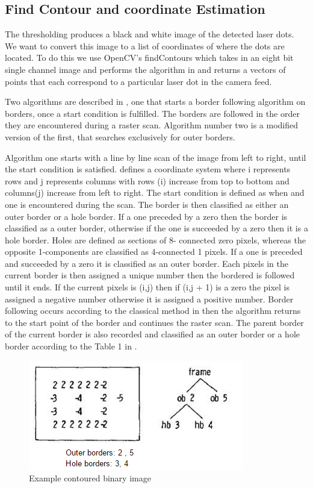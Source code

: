 \documentclass[a4paper]{article}
\begin{document}
\subsection{Find Contour and coordinate Estimation}
The thresholding produces a black and white image of the detected laser dots. We want to convert this image to a list of coordinates of where the dots are located. To do this we use OpenCV's findContours which takes in an eight bit single channel image and performs the algorithm in \cite{suzuki1985topological} and returns a vectors of points that each correspond to a particular laser dot in the camera feed. 

Two algorithms are described in \cite{suzuki1985topological}, one that starts a border following algorithm on borders, once a start condition is fulfilled. The borders are followed in the order they are encountered during a raster scan. Algorithm number two is a modified version of the first, that searches exclusively for outer borders. 

Algorithm one starts with a line by line scan of the image from left to right, until the start condition is satisfied. \cite{suzuki1985topological} defines a coordinate system where i represents rows and j represents columns with rows (i) increase from top to bottom and columns(j) increase from left to right. The start condition is defined as when and one is encountered during the scan. The border is then classified as either an outer border or a hole border. If a one preceded by a zero then the border is classified as a outer border, otherwise if the one is succeeded by a zero then it is a hole border. Holes are defined as sections of 8- connected zero pixels, whereas the opposite 1-components are classified as 4-connected 1 pixels. If a one is preceded and succeeded by a zero it is classified as an outer border. Each pixels in the current border is then assigned a unique number then the bordered is followed until it ends. If the current pixels is (i,j) then if (i,j + 1) is a zero the pixel is assigned a negative number otherwise it is assigned a positive number. Border following occurs according to the classical method in \cite{rosenfeld2014digital} then the algorithm returns to the start point of the border and continues the raster scan. The parent border of the current border is also recorded and classified as an outer border or a hole border according to the Table 1 in \cite{suzuki1985topological}. 

\begin{figure}
	\includegraphics{contour.png}
	\caption{Example contoured binary image \cite{suzuki1985topological}}
\end{figure}
\end{document}
